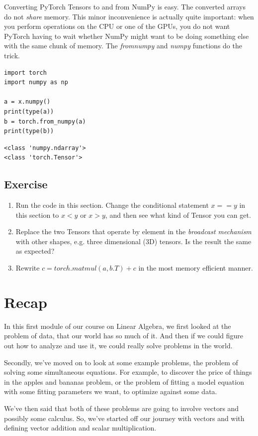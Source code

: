 \documentclass[]{article}
\begin{document}
Converting PyTorch Tensors to and from NumPy is easy. The converted arrays do not \textit{share} memory. This minor inconvenience is actually quite important: when you perform operations on the CPU or one of the GPUs, you do not want PyTorch having to wait whether NumPy might want to be doing something else with the same chunk of memory. The \textit{from\textunderscore numpy} and \textit{numpy} functions do the trick.

\begin{verbatim}
import torch
import numpy as np

a = x.numpy()
print(type(a))
b = torch.from_numpy(a)
print(type(b))
\end{verbatim}

\begin{verbatim}
<class 'numpy.ndarray'>
<class 'torch.Tensor'>
\end{verbatim}

\subsection{Exercise}

\begin{enumerate}
	\item Run the code in this section. Change the conditional statement $ x == y $ in this section to $ x < y $ or $ x > y $, and then see what kind of Tensor you can get.
	\item Replace the two Tensors that operate by element in the \textit{broadcast mechanism} with other shapes, e.g. three dimensional (3D) tensors. Is the result the same as expected?
	\item Rewrite $ c = torch.matmul(a, b.T) + c $ in the most memory efficient manner.
\end{enumerate}

\section{Recap}

In this first module of our course on Linear Algebra, we first looked at the problem of data, that our world has so much of it. And then if we could figure out how to analyze and use it, we could really solve problems in the world.

Secondly, we've moved on to look at some example problems, the problem of solving some simultaneous equations. For example, to discover the price of things in the apples and bananas problem, or the problem of fitting a model equation with some fitting parameters we want, to optimize against some data.

We've then said that both of these problems are going to involve vectors and possibly some calculus. So, we've started off our journey with vectors and with defining vector addition and scalar multiplication.

\nocite{*}

\printbibliography
\end{document}

